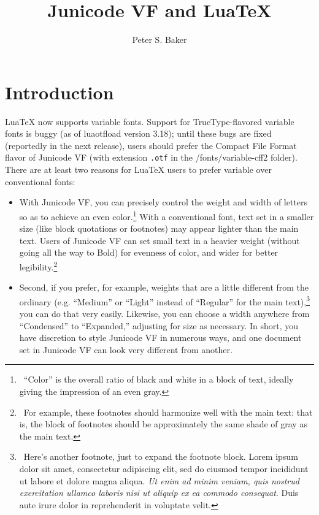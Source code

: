 \documentclass[11pt]{article}
\title{Junicode VF and Lua\kern-2pt\TeX}
\author{Peter S. Baker}
\date{}
\newcommand{\ltech}{Lua\kern-1.5pt\TeX}
\begin{document}

\maketitle

\section*{Introduction}

\ltech{} now supports variable fonts. Support for TrueType-flavored
variable fonts is buggy (as of luaotfload version 3.18); until these bugs
are fixed (reportedly in the next release), users should prefer the Compact
File Format flavor of
Junicode VF (with extension \texttt{.otf} in the \slash fonts\slash variable-cff2 folder).\\

There are at least two reasons for \ltech{} users to prefer variable over
conventional fonts:
\begin{itemize}
\item With Junicode VF, you can precisely control the weight and width of letters
so as to achieve an even color.\footnote{\ “Color” is the overall ratio of black
and white in a block of text, ideally giving the impression of an even gray.}
With a conventional font, text set in a smaller size (like block quotations or
footnotes) may appear lighter than the main text. Users of Junicode VF can set small text
in a heavier weight (without going all the way to Bold) for evenness of color, and wider for better
legibility.\footnote{\ For example, these footnotes should harmonize well
with the main text: that is, the block of footnotes should be approximately the
same shade of gray as the main text.}
\item Second, if you prefer,
for example, weights that are a little different from the ordinary (e.g.
{\mediumupright “Medium”} or {\light “Light”}
instead of “Regular” for the main text),\footnote{\ Here's another footnote, just
to expand the footnote block. Lorem ipsum dolor sit amet, consectetur adipiscing elit,
sed do eiusmod tempor incididunt ut labore et dolore magna aliqua. \textit{Ut enim ad
minim veniam, quis nostrud exercitation ullamco laboris nisi ut aliquip ex ea
commodo consequat}. Duis aute irure dolor in reprehenderit in voluptate velit.}
you can do that very easily. Likewise, you can choose a width anywhere from
{\condensed “Condensed”} to {\expanded “Expanded,”} adjusting for size as necessary.
In short, you have discretion to style Junicode VF in numerous ways, and one
document set in Junicode VF can look very different from another.
\end{itemize}
\end{document}
